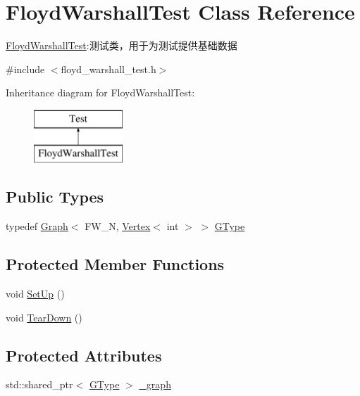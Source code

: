 \hypertarget{class_floyd_warshall_test}{}\section{Floyd\+Warshall\+Test Class Reference}
\label{class_floyd_warshall_test}


\hyperlink{class_floyd_warshall_test}{Floyd\+Warshall\+Test}\+:测试类，用于为测试提供基础数据  




{\ttfamily \#include $<$floyd\+\_\+warshall\+\_\+test.\+h$>$}

Inheritance diagram for Floyd\+Warshall\+Test\+:\begin{figure}[H]
\begin{center}
\leavevmode
\includegraphics[height=2.000000cm]{class_floyd_warshall_test}
\end{center}
\end{figure}
\subsection*{Public Types}
\begin{DoxyCompactItemize}
\item 
typedef \hyperlink{struct_introduction_to_algorithm_1_1_graph_algorithm_1_1_graph}{Graph}$<$ F\+W\+\_\+\+N, \hyperlink{struct_introduction_to_algorithm_1_1_graph_algorithm_1_1_vertex}{Vertex}$<$ int $>$ $>$ \hyperlink{class_floyd_warshall_test_a4a5605ca735a94fb6f556aed58c83551}{G\+Type}
\end{DoxyCompactItemize}
\subsection*{Protected Member Functions}
\begin{DoxyCompactItemize}
\item 
void \hyperlink{class_floyd_warshall_test_af9de5944653730e05650280fa124d7c6}{Set\+Up} ()
\item 
void \hyperlink{class_floyd_warshall_test_aa1c5bddcfc5bea6a9882b6a56b2ee37f}{Tear\+Down} ()
\end{DoxyCompactItemize}
\subsection*{Protected Attributes}
\begin{DoxyCompactItemize}
\item 
std\+::shared\+\_\+ptr$<$ \hyperlink{class_floyd_warshall_test_a4a5605ca735a94fb6f556aed58c83551}{G\+Type} $>$ \hyperlink{class_floyd_warshall_test_a040517767832bad0943c797e4ef2c5ab}{\+\_\+graph}
\end{DoxyCompactItemize}


